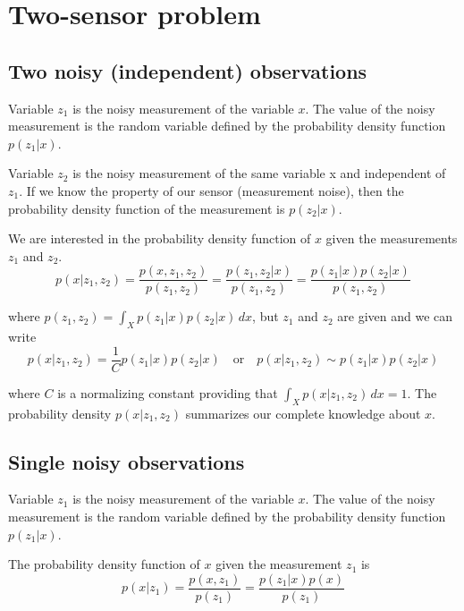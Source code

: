 \section{Two-sensor problem}

\subsection{Two noisy (independent) observations}

Variable $z_1$ is the noisy measurement of the variable $x$. The value of the
noisy measurement is the random variable defined by the probability density
function $p(z_1|x)$.

Variable $z_2$ is the noisy measurement of the same variable x and independent
of $z_1$. If we know the property of our sensor (measurement noise), then the
probability density function of the measurement is $p(z_2|x)$.

We are interested in the probability density function of $x$ given the
measurements $z_1$ and $z_2$.
\begin{equation*}
  p(x|z_1, z_2) = \frac{p(x, z_1, z_2)}{p(z_1, z_2)}
                = \frac{p(z_1, z_2|x)}{p(z_1, z_2)}
                = \frac{p(z_1|x) p(z_2|x)}{p(z_1, z_2)}
\end{equation*}

where $p(z_1, z_2) = \int_X p(z_1|x) p(z_2|x) \,dx$, but $z_1$ and $z_2$ are
given and we can write
\begin{equation*}
  p(x|z_1, z_2) = \frac{1}{C} p(z_1|x) p(z_2|x) \quad \text{or} \quad
    p(x|z_1, z_2) \sim p(z_1|x) p(z_2|x)
\end{equation*}

where $C$ is a normalizing constant providing that
$\int_X p(x|z_1, z_2) \,dx = 1$. The probability density $p(x|z_1, z_2)$
summarizes our complete knowledge about $x$.

\subsection{Single noisy observations}

Variable $z_1$ is the noisy measurement of the variable $x$. The value of the
noisy measurement is the random variable defined by the probability density
function $p(z_1|x)$.

The probability density function of $x$ given the measurement $z_1$ is
\begin{equation*}
  p(x|z_1) = \frac{p(x, z_1)}{p(z_1)} = \frac{p(z_1|x) p(x)}{p(z_1)}
\end{equation*}

